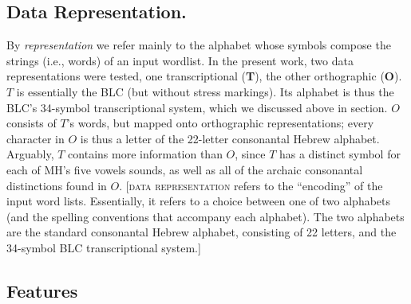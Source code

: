 \subsection {Data Representation.} 
By \emph{representation} we refer mainly to the alphabet whose symbols compose the strings (i.e., words) 
of an input wordlist.
In the present work, two data representations were tested, one transcriptional 
(\textbf{T}), the other orthographic (\textbf{O}). 
$T$ is essentially the \ac{BLC} (but without stress markings). Its alphabet is thus the \ac{BLC}'s 34-symbol
transcriptional system, which we discussed above in section. %
$O$ consists of $T$'s words, but mapped onto orthographic representations; every character in $O$ is thus
a letter of the 22-letter consonantal Hebrew alphabet.
Arguably, $T$ contains more information than $O$,
since $T$ has a distinct symbol for each of \ac{MH}'s five vowels sounds, %
as well as all of the archaic consonantal distinctions found in $O$. 
[\textsc{data representation} refers to the ``encoding'' of the input
word lists. Essentially, it refers to a choice between one of two alphabets (and the spelling conventions that 
accompany each alphabet). The two alphabets are the standard consonantal Hebrew alphabet, consisting of 22 letters,
and the 34-symbol \ac{BLC} transcriptional system.]

\subsection{Features}\label{sec:expvars:features}
\label{sec:features}


